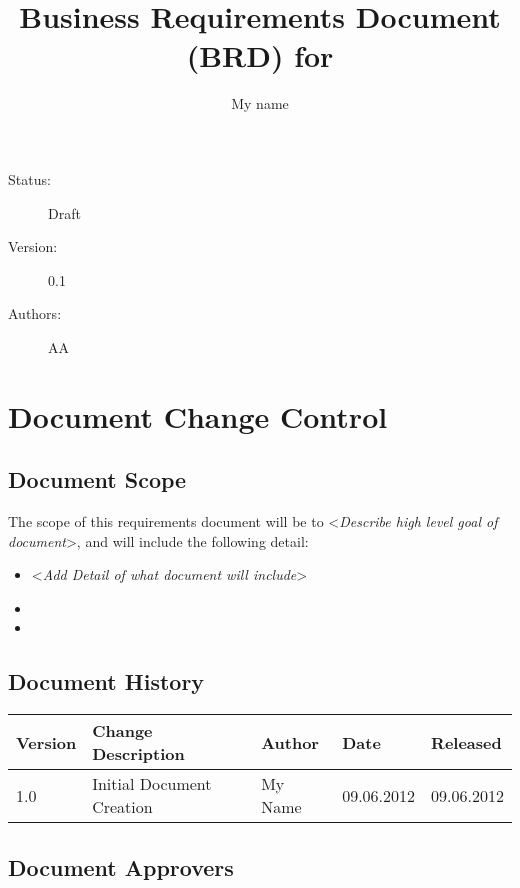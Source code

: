 \documentclass[english,12pt]{scrartcl}
\title{Business Requirements Document (BRD) for \project}
\author{My name}
\newcommand{\comment}[1]{\textless\textit{#1}\textgreater\vspace*{1ex}}
\begin{document}
\maketitle
 
\vfill
 
{\large
\begin{description}
\item [Status:] Draft 
\item [Version:] 0.1
\item [Authors:] AA
\end{description}}
 
\clearpage
 
\tableofcontents
 
\section{Document Change Control}
 
\subsection{Document Scope}
 
The scope of this requirements document will be to \comment{Describe high level goal of document}, and will include the following detail:
 
\begin{itemize}
\item \comment{Add Detail of what document will include}
\item 
\item 
\end{itemize}
 
\subsection{Document History}
 
\begin{tabular}{p{}p{}p{}p{}p{}    }\toprule
Version	& Change Description	&Author	&Date & Released \\ \midrule
1.0 & 	Initial Document Creation	& My Name & 09.06.2012 & 09.06.2012 \\ \bottomrule
\end{tabular}
 
\subsection{Document Approvers}
 
\end{document}
